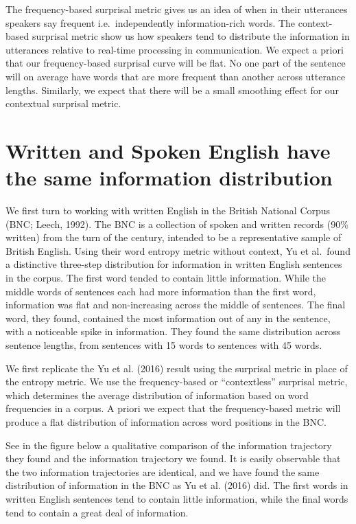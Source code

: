 \documentclass[11pt,]{article}
\begin{document}
The frequency-based surprisal metric gives us an idea of when in their utterances speakers say frequent i.e.~independently information-rich words. The context-based surprisal metric show us how speakers tend to distribute the information in utterances relative to real-time processing in communication. We expect a priori that our frequency-based surprisal curve will be flat. No one part of the sentence will on average have words that are more frequent than another across utterance lengths. Similarly, we expect that there will be a small smoothing effect for our contextual surprisal metric.

\hypertarget{written-and-spoken-english-have-the-same-information-distribution}{%
\section{Written and Spoken English have the same information distribution}\label{written-and-spoken-english-have-the-same-information-distribution}}

We first turn to working with written English in the British National Corpus (BNC; Leech, 1992). The BNC is a collection of spoken and written records (90\% written) from the turn of the century, intended to be a representative sample of British English. Using their word entropy metric without context, Yu et al.~found a distinctive three-step distribution for information in written English sentences in the corpus. The first word tended to contain little information. While the middle words of sentences each had more information than the first word, information was flat and non-increasing across the middle of sentences. The final word, they found, contained the most information out of any in the sentence, with a noticeable spike in information. They found the same distribution across sentence lengths, from sentences with 15 words to sentences with 45 words.

We first replicate the Yu et al. (2016) result using the surprisal metric in place of the entropy metric. We use the frequency-based or ``contextless'' surprisal metric, which determines the average distribution of information based on word frequencies in a corpus. A priori we expect that the frequency-based metric will produce a flat distribution of information across word positions in the BNC.

See in the figure below a qualitative comparison of the information trajectory they found and the information trajectory we found. It is easily observable that the two information trajectories are identical, and we have found the same distribution of information in the BNC as Yu et al. (2016) did. The first words in written English sentences tend to contain little information, while the final words tend to contain a great deal of information.
\end{document}
